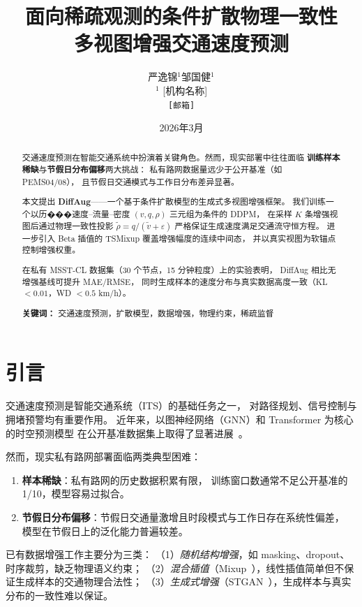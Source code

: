\documentclass[12pt]{article}
\title{\textbf{面向稀疏观测的条件扩散物理一致性\\多视图增强交通速度预测}}
\author{
  严逸锦$^{1}$\quad 邹国健$^{1}$\\[4pt]
  $^{1}$ [机构名称]\\
  \texttt{[邮箱]}
}
\date{2026年3月}
\begin{document}
\maketitle

\begin{abstract}
交通速度预测在智能交通系统中扮演着关键角色。然而，现实部署中往往面临
\textbf{训练样本稀缺}与\textbf{节假日分布偏移}两大挑战：
私有路网数据量远少于公开基准（如 PEMS04/08），
且节假日交通模式与工作日分布差异显著。

本文提出 \textbf{DiffAug}——一个基于条件扩散模型的生成式多视图增强框架。
我们训练一个以历���速度–流量–密度 $(v, q, \rho)$ 三元组为条件的 DDPM，
在采样 $K$ 条增强视图后通过物理一致性投影 $\tilde{\rho} = q/(\tilde{v}+\varepsilon)$
严格保证生成速度满足交通流守恒方程。
进一步引入 Beta 插值的 TSMixup 覆盖增强幅度的连续中间态，
并以真实视图为软锚点控制增强权重。

在私有 MSST-CL 数据集（30 个节点，15 分钟粒度）上的实验表明，
DiffAug 相比无增强基线可提升 MAE/RMSE，
同时生成样本的速度分布与真实数据高度一致（KL $< 0.01$，WD $< 0.5$ km/h）。

\textbf{关键词：} 交通速度预测，扩散模型，数据增强，物理约束，稀疏监督
\end{abstract}

\section{引言}
\label{sec:intro}

交通速度预测是智能交通系统（ITS）的基础任务之一，
对路径规划、信号控制与拥堵预警均有重要作用。
近年来，以图神经网络（GNN）和 Transformer 为核心的时空预测模型
在公开基准数据集上取得了显著进展~\cite{stgformer,staeformer}。

然而，现实私有路网部署面临两类典型困难：
\begin{enumerate}
  \item \textbf{样本稀缺}：私有路网的历史数据积累有限，
    训练窗口数通常不足公开基准的 1/10，模型容易过拟合。
  \item \textbf{节假日分布偏移}：节假日交通量激增且时段模式与工作日存在系统性偏差，
    模型在节假日上的泛化能力普遍较差。
\end{enumerate}

已有数据增强工作主要分为三类：
（1）\textit{随机结构增强}，如 masking、dropout、时序裁剪，缺乏物理语义约束；
（2）\textit{混合插值}（Mixup~\cite{mixup}），线性插值简单但不保证生成样本的交通物理合法性；
（3）\textit{生成式增强}（STGAN~\cite{stgan}），生成样本与真实分布的一致性难以保证。
\end{document}
